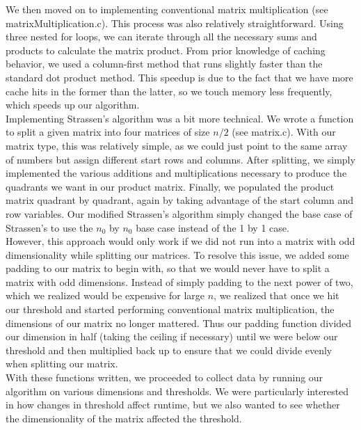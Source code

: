 \documentclass[12pt]{article}
\begin{document}
We then moved on to implementing conventional matrix multiplication (see matrixMultiplication.c). This process was also relatively straightforward. Using three nested for loops, we can iterate through all the necessary sums and products to calculate the matrix product. From prior knowledge of caching behavior, we used a column-first method that runs slightly faster than the standard dot product method. This speedup is due to the fact that we have more cache hits in the former than the latter, so we touch memory less frequently, which speeds up our algorithm. \\

Implementing Strassen's algorithm was a bit more technical. We wrote a function to split a given matrix into four matrices of size $n/2$ (see matrix.c). With our matrix type, this was relatively simple, as we could just point to the same array of numbers but assign different start rows and columns. After splitting, we simply implemented the various additions and multiplications necessary to produce the quadrants we want in our product matrix. Finally, we populated the product matrix quadrant by quadrant, again by taking advantage of the start column and row variables. Our modified Strassen's algorithm simply changed the base case of Strassen's to use the $n_0$ by $n_0$ base case instead of the 1 by 1 case. \\

However, this approach would only work if we did not run into a matrix with odd dimensionality while splitting our matrices. To resolve this issue, we added some padding to our matrix to begin with, so that we would never have to split a matrix with odd dimensions. Instead of simply padding to the next power of two, which we realized would be expensive for large $n$, we realized that once we hit our threshold and started performing conventional matrix multiplication, the dimensions of our matrix no longer mattered. Thus our padding function divided our dimension in half (taking the ceiling if necessary) until we were below our threshold and then multiplied back up to ensure that we could divide evenly when splitting our matrix. \\

With these functions written, we proceeded to collect data by running our algorithm on various dimensions and thresholds. We were particularly interested in how changes in threshold affect runtime, but we also wanted to see whether the dimensionality of the matrix affected the threshold. \\
\end{document}
